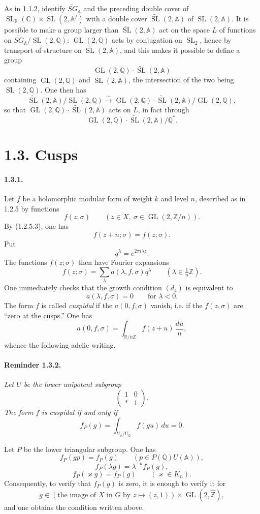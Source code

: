 \documentclass[10pt,a4paper]{article}
\providecommand{\GL}{\operatorname{GL}}
\providecommand{\SL}{\operatorname{SL}}
\providecommand{\R}{\mathbb R}
\providecommand{\Q}{\mathbb Q}
\providecommand{\Z}{\mathbb Z}
\providecommand{\C}{\mathbb C}
\providecommand{\A}{\mathbb A}
\providecommand{\Af}{\mathbb A^f}
\providecommand{\SG}{SG}
\providecommand{\iso}{\xrightarrow{\sim}}
\begin{document}
As in 1.1.2, identify $\widetilde{\SG}_{\A}$ and the preceding double cover of $\SL_{\R}(\C)\times\SL(2,\Af)$ with a double cover $\widetilde{\SL}(2,\A)$ of $\SL(2,\A)$. It is possible to make a group larger than $\widetilde{\SL}(2,\A)$ act on the space $L$ of functions on $\widetilde{\SG}_{\A}/\SL(2,\Q)$: $\GL(2,\Q)$ acts by conjugation on $\SL_2$, hence by transport of structure on $\widetilde{\SL}(2,\A)$, and this makes it possible to define a group
\[
\GL(2,\Q)\cdot\widetilde{\SL}(2,\A)
\]
containing $\GL(2,\Q)$ and $\widetilde{\SL}(2,\A)$, the intersection of the two being $\SL(2,\Q)$. One then has
\[
\widetilde{\SL}(2,\A)/\SL(2,\Q)
\iso
\GL(2,\Q)\cdot\widetilde{\SL}(2,\A)/\GL(2,\Q),
\]
so that $\GL(2,\Q)\cdot\widetilde{\SL}(2,\A)$ acts on $L$, in fact through
\[
\GL(2,\Q)\cdot\widetilde{\SL}(2,\A)/\Q^*.
\]

\clearpage
{}
\hypertarget{authority-20}{}
\section*{1.3. Cusps}

\paragraph{1.3.1.} Let $f$ be a holomorphic modular form of weight $k$ and level $n$, described as in 1.2.5 by functions
\[
f(z;\sigma)\qquad(z\in X,\ \sigma\in\GL(2,\Z/n)).
\]
By (1.2.5.3), one has
\[
f(z+n;\sigma)=f(z;\sigma).
\]
Put
\[
q^\lambda=e^{2\pi i\lambda z}.
\]
The functions $f(z;\sigma)$ then have Fourier expansions
\[
\tag{1.3.1.1}
f(z;\sigma)=\sum_{\lambda}a(\lambda,f,\sigma)q^\lambda\qquad(\lambda\in\tfrac1n\Z).
\]
One immediately checks that the growth condition $(d_4)$ is equivalent to
\[
\tag{1.3.1.2}
a(\lambda,f,\sigma)=0\qquad\text{for }\lambda<0.
\]
The form $f$ is called \emph{cuspidal} if the $a(0,f,\sigma)$ vanish, i.e. if the $f(z,\sigma)$ are “zero at the cusps.” One has
\[
a(0,f,\sigma)=\int_{\R/n\Z}f(z+u)\,\frac{du}{n},
\]
whence the following adelic writing.

\paragraph{Reminder 1.3.2.}{\itshape  Let $U$ be the lower unipotent subgroup
\[
\begin{pmatrix}1&0\\ *&1\end{pmatrix}.
\]
The form $f$ is \emph{cuspidal} if and only if
\[
\tag{1.3.2.1}
f_P(g)=\int_{U_\A/U_\Q}f(gu)\,du=0.
\]
\par}
Let $P$ be the lower triangular subgroup. One has
\[
f_P(gp)=f_P(g)\qquad(p\in P(\Q)U(\A)),
\]
\[
f_P(\lambda g)=\lambda^{-k}f_P(g),
\]
\[
f_P(\varkappa g)=f_P(g)\qquad(\varkappa\in K_n).
\]
Consequently, to verify that $f_P(g)$ is zero, it is enough to verify it for
\[
g\in(\text{the image of }X\text{ in }G\text{ by }z\mapsto(z,1))\times\GL(2,\widehat{\Z}),
\]
and one obtains the condition written above.
\end{document}
